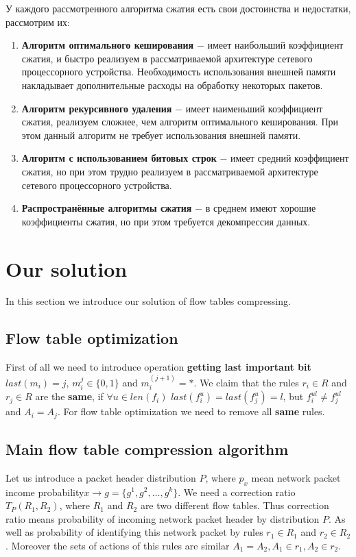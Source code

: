 \documentclass[conference]{IEEEtran}
\begin{document}
        У каждого рассмотренного алгоритма сжатия есть свои достоинства и недостатки, рассмотрим их:
        \begin{enumerate}
            \item \textbf{Алгоритм оптимального кеширования} \(-\) имеет наибольший коэффициент сжатия, и быстро реализуем в рассматриваемой архитектуре сетевого процессорного устройства. 
                Необходимость использования внешней памяти накладывает дополнительные расходы на обработку некоторых пакетов.
            \item \textbf{Алгоритм рекурсивного удаления} \(-\) имеет наименьший коэффициент сжатия,
                реализуем сложнее, чем алгоритм оптимального кеширования. При этом данный алгоритм не требует использования внешней памяти.
            \item \textbf{Алгоритм с использованием битовых строк} \(-\) имеет средний коэффициент сжатия, но при этом трудно реализуем в рассматриваемой архитектуре сетевого процессорного устройства.
            \item \textbf{Распространённые алгоритмы сжатия} \(-\) в среднем имеют хорошие коэффициенты сжатия, но при этом требуется декомпрессия данных.
        \end{enumerate}
  
    \section{Our solution}
        In this section we introduce our solution of flow tables compressing.
        \subsection{Flow table optimization}
            First of all we need to introduce operation {\bf getting last important bit} 
            \(last(m_i) = j\), \(m_i^j \in \{0, 1\}\) and \(m_i^{(j+1)} = *\). 
            We claim that the rules \(r_i \in R\) and \(r_j \in R\) are the {\bf same}, 
            if \(\forall u \in len(f_i)\) \(last(f_i^u) = last(f_j^u) = l\), but \(f_i^{ul} \neq f_j^{ul}\) and \(A_i = A_j\).
            For flow table optimization we need to remove all {\bf same} rules.

        \subsection{Main flow table compression algorithm}
            Let us introduce a packet header distribution \(P\), where \(p_x\) mean network packet income probability\(x \rightarrow g=\{g^1,g^2,\ldots,g^k\}\).
        We need a correction ratio \(T_P(R_1, R_2)\), where \(R_1\) and \(R_2\) are two different flow tables. 
        Thus correction ratio means probability of incoming network packet header by distribution \(P\).
        As well as probability of identifying this network packet by rules \(r_1 \in R_1\) and \(r_2 \in R_2\).
        Moreover the sets of actions of this rules are similar \(A_1 = A_2, A_1 \in r_1, A_2 \in r_2\).
        
\end{document}
